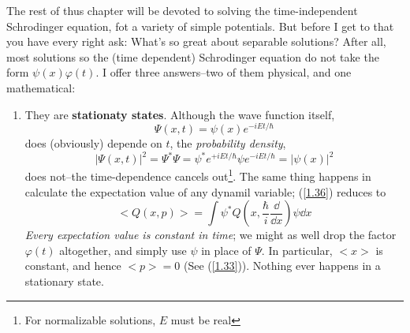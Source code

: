 The rest of thus chapter will be devoted to solving the time-independent Schrodinger equation, fot a variety of simple potentials. But before I get to that you have every right ask: What's so great about separable solutions? After all, most solutions so the (time dependent) Schrodinger equation do not take the form $\psi(x)\varphi(t)$. I offer three answers--two of them physical, and one mathematical:
\begin{enumerate}
	\item They are \textbf{stationaty states}. Although the wave function itself,
\begin{equation}\label{2.7}
	\Psi(x,t)=\psi(x)e^{-iEt/\hbar}
\end{equation}
does (obviously) depende on $t$, the \textit{probability density},
\begin{equation}\label{2.8}
	|\Psi(x,t)|^2=\Psi^*\Psi=\psi^*e^{+iEt/\hbar}\psi e^{-iEt/\hbar}=|\psi(x)|^2
\end{equation}
does not--the time-dependence cancels out\footnote{For normalizable solutions, $E$ must be real}. The same thing happens in calculate the expectation value of any dynamil variable; (\ref{1.36}) reduces to
\begin{equation}\label{2.9}
	<Q(x,p)>=\int\psi^*Q\left(x,\frac{\hbar}{i}\frac{\dd}{\dd x}\right)\psi\dd x
\end{equation}
\textit{Every expectation value is constant in time}; we might as well drop the factor $\varphi(t)$ altogether, and simply use $\psi$ in place of $\Psi$. In particular, $<x>$ is constant, and hence $<p>=0$ (See (\ref{1.33})). Nothing ever happens in a stationary state.


\end{enumerate}
